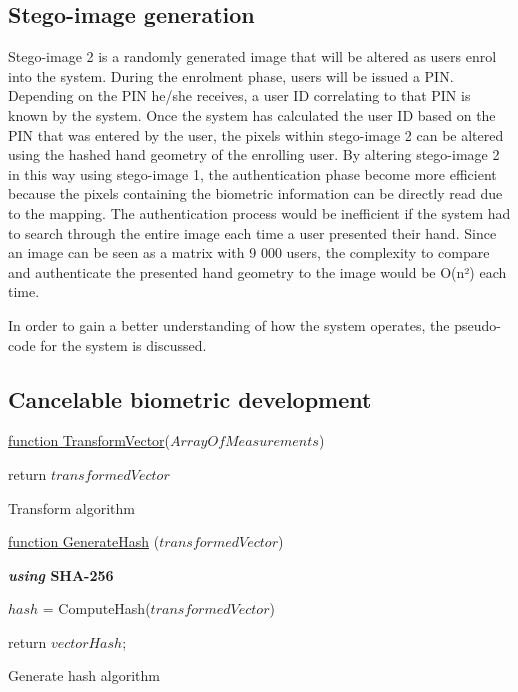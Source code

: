 \subsection{Stego-image generation}

Stego-image 2 is a randomly generated image that will be altered as users enrol into the system. During the enrolment phase, users will be issued a PIN. Depending on the PIN he/she receives, a user ID correlating to that PIN is known by the system. Once the system has calculated the user ID based on the PIN that was entered by the user, the pixels within stego-image 2 can be altered using the hashed hand geometry of the enrolling user. By altering stego-image 2 in this way using stego-image 1, the authentication phase become more efficient because the pixels containing the biometric information can be directly read due to the mapping. The authentication process would be inefficient if the system had to search through the entire image each time a user presented their hand. Since an image can be seen as a matrix with 9 000 users, the complexity to compare and authenticate the presented hand geometry to the image would be O(n²) each time. 

In order to gain a better understanding of how the system operates, the pseudo-code for the system is discussed.

\subsection{Cancelable biometric development}


\begin{algorithm}
     
     \underline{function TransformVector}($ArrayOfMeasurements$)\;
     
     
     return $transformedVector$\;
     \caption{Transform algorithm}
\end{algorithm}


\begin{algorithm}
     
     \underline{function GenerateHash} ($transformedVector$)\;
     
     \textbf{\textit{using} SHA-256}{
        $hash$ = ComputeHash($transformedVector$)\;
        
    
     }
     return $vectorHash$;
     
     \caption{Generate hash algorithm}
\end{algorithm}

